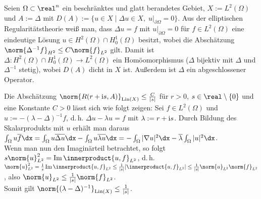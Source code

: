 \linie

\begin{Bsp}
    Seien $\Omega \subset \real^n$ ein beschränktes und glatt berandetes Gebiet,
    $X := L^2(\Omega)$ und $A := \Delta$ mit
    $D(A) := \{u \in X \;|\; \Delta u \in X,\; u|_{\partial\Omega} = 0\}$.
    Aus der elliptischen Regularitätstheorie weiß man, dass $\Delta u = f$ mit
    $u|_{\partial\Omega} = 0$ für $f \in L^2(\Omega)$ eine eindeutige Lösung
    $u \in H^2(\Omega) \cap H^1_0(\Omega)$ besitzt,
    wobei die Abschätzung $\norm{\Delta^{-1} f}_{H^2} \le C \norm{f}_{L^2}$ gilt.
    Damit ist $\Delta\colon H^2(\Omega) \cap H^1_0(\Omega) \to L^2(\Omega)$ ein
    Homöomorphismus ($\Delta$ bijektiv mit $\Delta$ und $\Delta^{-1}$ stetig),
    wobei $D(A)$ dicht in $X$ ist.
    Außerdem ist $\Delta$ ein abgeschlossener Operator.

    Die Abschätzung $\norm{R(r + \iu s, A)}_{\Lin(X)} \le \frac{C}{|s|}$
    für $r > 0$, $s \in \real \setminus \{0\}$ und eine Konstante $C > 0$
    lässt sich wie folgt zeigen:
    Sei $f \in L^2(\Omega)$ und $u := -(\lambda - \Delta)^{-1} f$, d.\,h.
    $\Delta u - \lambda u = f$ mit $\lambda := r + \mathrm{i} s$.
    Durch Bildung des Skalarprodukts mit $u$ erhält man daraus\\
    $\int_\Omega u \overline{f} \dx
    = \int_\Omega u \overline{\Delta u} \dx - \int_\Omega u \overline{\lambda u} \dx
    = -\int_\Omega |\nabla u|^2 \dx - \overline{\lambda} \int_\Omega |u|^2 \dx$.\\
    Wenn man nun den Imaginärteil betrachtet, so folgt
    $s \norm{u}_{L^2}^2 = \Im \innerproduct{u, f}_{L^2}$, d.\,h.\\
    $\norm{u}_{L^2}^2 = \frac{1}{s} \Im \innerproduct{u, f}_{L^2}
    \le \frac{1}{|s|} |\innerproduct{u, f}_{L^2}|
    \le \frac{1}{|s|} \norm{u}_{L^2} \norm{f}_{L^2}$, also
    $\norm{u}_{L^2} \le \frac{1}{|s|} \norm{f}_{L^2}$.\\
    Somit gilt $\norm{(\lambda - \Delta)^{-1}}_{\Lin(X)} \le \frac{1}{|s|}$.
\end{Bsp}

\pagebreak
